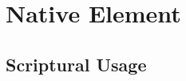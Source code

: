 \section{Native Element}
	\label{NATIVEELEMENT}
	





\subsection{Scriptural Usage} %
	\label{NATIVEELEMENT-SCRIPTURES}

	
	
